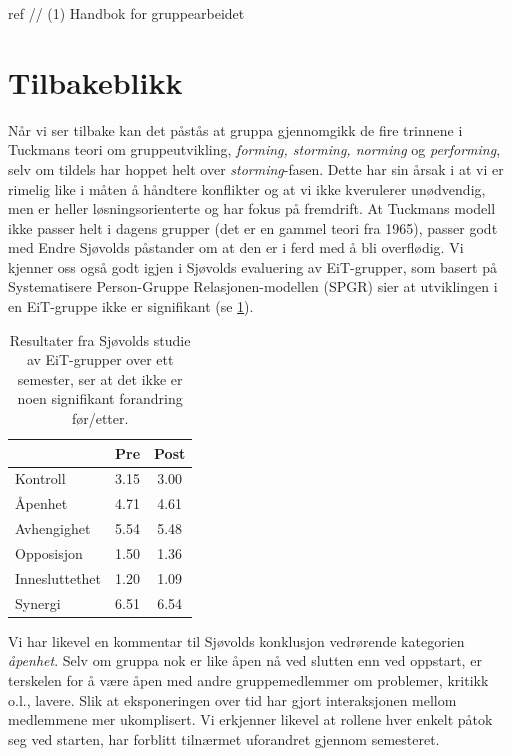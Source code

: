 ref // (1) Handbok for gruppearbeidet\\

\section{Tilbakeblikk}
\label{sec:tilbakeblikk}

Når vi ser tilbake kan det påstås at gruppa gjennomgikk de fire trinnene i
Tuckmans \cite{tuckman} teori om gruppeutvikling, \emph{forming, storming,
norming} og \emph{performing}, selv om tildels har hoppet helt over
\emph{storming}-fasen. Dette har sin årsak i at vi er rimelig like i måten å
håndtere konflikter og at vi ikke kverulerer unødvendig, men er heller
løsningsorienterte og har fokus på fremdrift. At Tuckmans modell ikke passer
helt i dagens grupper (det er en gammel teori fra 1965), passer godt med Endre
Sjøvolds \cite{sjovold} påstander om at den er i ferd med å bli overflødig. Vi
kjenner oss også godt igjen i Sjøvolds evaluering av EiT-grupper, som basert på
Systematisere Person-Gruppe Relasjonen-modellen (SPGR) sier at utviklingen i en
EiT-gruppe ikke er signifikant (se \cref{tab:sjovold}).

\begin{table}[ht!]
\centering
\begin{tabular}{l c c}
& Pre & Post \\ \hline
Kontroll & 3.15 & 3.00 \\
Åpenhet & 4.71 & 4.61 \\
Avhengighet & 5.54 & 5.48 \\
Opposisjon & 1.50 & 1.36 \\
Innesluttethet & 1.20 & 1.09 \\
Synergi & 6.51 & 6.54 \\ \hline
\end{tabular}
\caption{Resultater fra Sjøvolds studie av EiT-grupper over ett semester, ser at
det ikke er noen signifikant forandring før/etter.}
\label{tab:sjovold}
\end{table}

Vi har likevel en kommentar til Sjøvolds konklusjon vedrørende kategorien
\emph{åpenhet}. Selv om gruppa nok er like åpen nå ved slutten enn ved oppstart,
er terskelen for å være åpen med andre gruppemedlemmer om problemer, kritikk
o.l., lavere. Slik at eksponeringen over tid har gjort interaksjonen mellom
medlemmene mer ukomplisert. Vi erkjenner likevel at rollene hver enkelt påtok
seg ved starten, har forblitt tilnærmet uforandret gjennom semesteret.

